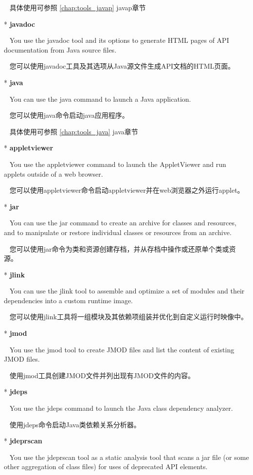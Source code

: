 \hypersetup{linkcolor=blue}

~ 具体使用可参照 \textcolor[rgb]{0,0,1}{\ref{chap:tools_javap}} javap章节

* \textbf{javadoc}

~ You use the javadoc tool and its options to generate HTML pages of API documentation from Java source files.

~ 您可以使用javadoc工具及其选项从Java源文件生成API文档的HTML页面。

* \textbf{java} 

~ You can use the java command to launch a Java application.

~ 您可以使用java命令启动java应用程序。

~ 具体使用可参照 \textcolor[rgb]{0,0,1}{\ref{chap:tools_java}} java章节

* \textbf{appletviewer}

~ You use the appletviewer command to launch the AppletViewer and run applets outside of a web browser.

~ 您可以使用appletviewer命令启动appletviewer并在web浏览器之外运行applet。

* \textbf{jar}

~ You can use the jar command to create an archive for classes and resources, and to manipulate or restore individual classes or resources from an archive.

~ 您可以使用jar命令为类和资源创建存档，并从存档中操作或还原单个类或资源。

* \textbf{jlink}

~ You can use the jlink tool to assemble and optimize a set of modules and their dependencies into a custom runtime image.

~ 您可以使用jlink工具将一组模块及其依赖项组装并优化到自定义运行时映像中。

* \textbf{jmod}

~ You use the jmod tool to create JMOD files and list the content of existing JMOD files.

~ 使用jmod工具创建JMOD文件并列出现有JMOD文件的内容。

* \textbf{jdeps} 

~ You use the jdeps command to launch the Java class dependency analyzer.

~ 使用jdeps命令启动Java类依赖关系分析器。

* \textbf{jdeprscan} 

~ You use the jdeprscan tool as a static analysis tool that scans a jar file (or some other aggregation of class files) for uses of deprecated API elements.

